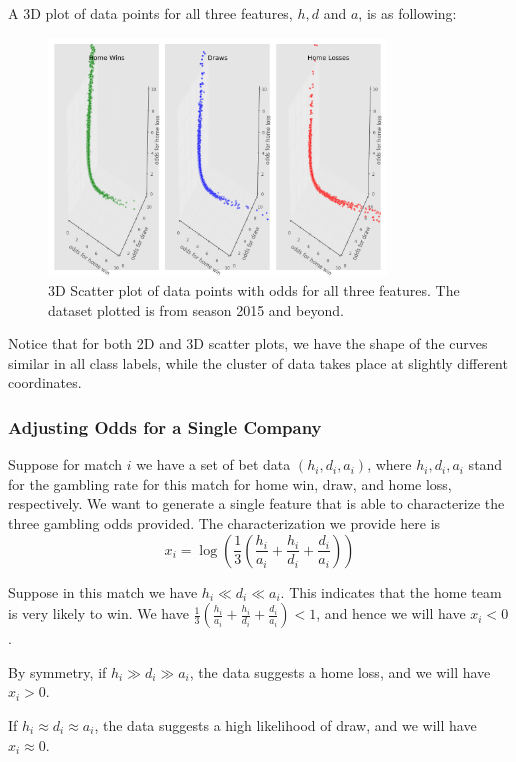 \documentclass{article}
\begin{document}
	A 3D plot of data points for all three features, $h, d$ and $a$, is as following:
	\begin{figure}[!ht]
		\centering
		\includegraphics[width=0.8\textwidth]{3D_15.png}
		\caption{3D Scatter plot of data points with odds for all three features. The dataset plotted is from season 2015 and beyond.}
	\end{figure}
	
	Notice that for both 2D and 3D scatter plots, we have the shape of the curves similar in all class labels, while the cluster of data takes place at slightly different coordinates.
	
	\subsubsection{Adjusting Odds for a Single Company}
	\label{single_comp}
	Suppose for match $i$ we have a set of bet data $(h_i, d_i, a_i)$, where $h_i, d_i, a_i$ stand for the gambling rate for this match for home win, draw, and home loss, respectively. We want to generate a single feature that is able to characterize the three gambling odds provided. The characterization we provide here is \[
	x_i = \log(\frac{1}{3}(\frac{h_i}{a_i} + \frac{h_i}{d_i} + \frac{d_i}{a_i}))
	\]
	
	Suppose in this match we have $h_i \ll d_i \ll a_i$. This indicates that the home team is very likely to win. We have $\frac{1}{3}(\frac{h_i}{a_i} + \frac{h_i}{d_i} + \frac{d_i}{a_i}) < 1$, and hence we will have $x_i < 0$. 
	
	By symmetry, if $h_i \gg d_i \gg a_i$, the data suggests a home loss, and we will have $x_i > 0$.
	
	If $h_i \approx d_i \approx a_i$, the data suggests a high likelihood of draw, and we will have $x_i \approx 0$.
	
\end{document}
